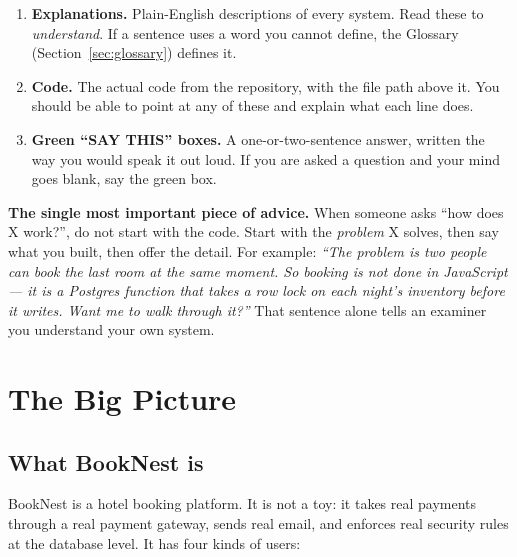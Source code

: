 \documentclass[11pt,a4paper]{article}
\begin{document}
\begin{enumerate}[leftmargin=*]
  \item \textbf{Explanations.} Plain-English descriptions of every system. Read
        these to \emph{understand}. If a sentence uses a word you cannot define,
        the Glossary (Section~\ref{sec:glossary}) defines it.
  \item \textbf{Code.} The actual code from the repository, with the file path
        above it. You should be able to point at any of these and explain what
        each line does.
  \item \textbf{Green ``SAY THIS'' boxes.} A one-or-two-sentence answer, written
        the way you would speak it out loud. If you are asked a question and your
        mind goes blank, say the green box.
\end{enumerate}

\begin{notebox}
\textbf{The single most important piece of advice.} When someone asks
``how does X work?'', do not start with the code. Start with the \emph{problem}
X solves, then say what you built, then offer the detail. For example:
\emph{``The problem is two people can book the last room at the same moment.
So booking is not done in JavaScript --- it is a Postgres function that takes a
row lock on each night's inventory before it writes. Want me to walk through it?''}
That sentence alone tells an examiner you understand your own system.
\end{notebox}

\newpage
\section{The Big Picture}

\subsection{What BookNest is}

BookNest is a hotel booking platform. It is not a toy: it takes real payments
through a real payment gateway, sends real email, and enforces real security
rules at the database level. It has four kinds of users:
\end{document}
